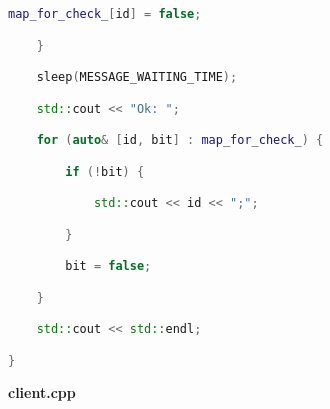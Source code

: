 \begin{lstlisting}[language=C++]
        map_for_check_[id] = false;

    }

    sleep(MESSAGE_WAITING_TIME);

    std::cout << "Ok: ";

    for (auto& [id, bit] : map_for_check_) {

        if (!bit) {

            std::cout << id << ";";

        }

        bit = false;

    }

    std::cout << std::endl;

}

\end{lstlisting}

\textbf{client.cpp}

